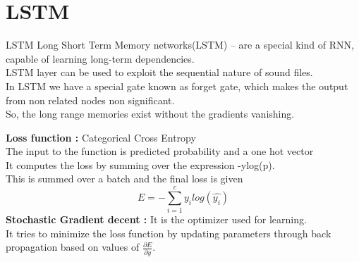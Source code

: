 \documentclass{beamer}
\theoremstyle{remark}
\numberwithin{equation}{section}
\begin{document}
\section{LSTM}
\begin{frame}{LSTM}
Long Short Term Memory networks(LSTM) – are a special kind of RNN, capable of learning long-term dependencies.\\
LSTM layer can be used to exploit the sequential nature of sound files. \\
In LSTM we have a special gate known as forget gate, which makes the output from non related nodes non significant. \\ So, the long range memories exist without the gradients vanishing.
\end{frame}
\begin{frame}{}
    \textbf{Loss function : } Categorical Cross Entropy \\
    The input to the function is predicted probability and a one hot vector \\
It computes the loss by summing over the expression -ylog(p). \\
This is summed over a batch and the final loss is given
    \begin{equation*}
        E = -\sum_{i =1}^{c}y_i log(\hat{y_i})
    \end{equation*}
    \textbf{Stochastic Gradient decent : } It is the optimizer used for learning. \\ It tries to minimize the loss function by updating parameters through back propagation based on values of $\frac{\partial E}{\partial y}$.
\end{frame}
\end{document}
